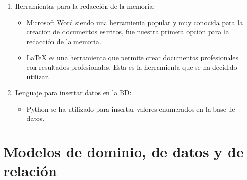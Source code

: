 \documentclass[11pt]{book}
\begin{document}
\begin{enumerate}
\begin{itemize}
	\end{itemize}
	\item Herramientas para la redacción de la memoria:
	\begin{itemize} 
		\item Microsoft Word siendo una herramienta popular y muy conocida para la creación de documentos escritos, fue nuestra primera opción para la redacción de la memoria.
		\item LaTeX es una herramienta que permite crear documentos profesionales con resultados profesionales. Esta es la herramienta que se ha decidido utilizar.
	\end{itemize}
	\item Lenguaje para insertar datos en la BD:
	\begin{itemize} 
		\item Python se ha utilizado para insertar valores enumerados en la base de datos.
	\end{itemize}
\end{enumerate}

\chapter{Modelos de dominio, de datos y de relación}\label{cap:modelos}
\end{document}

